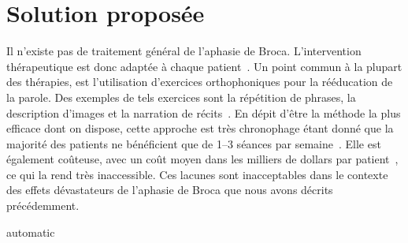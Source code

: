 \section{Solution proposée}

Il n'existe pas de traitement général de l'aphasie de Broca.
L'intervention thérapeutique est donc adaptée à chaque patient~\cite{Acharya_Wroten_2022}.
Un point commun à la plupart des thérapies, 
est l'utilisation d'exercices orthophoniques pour la rééducation de la parole.
Des exemples de tels exercices sont 
la répétition de phrases, la description d'images et la narration de récits~\cite{recover}.
En dépit d'être la méthode la plus efficace dont on dispose,
cette approche est très chronophage étant donné que 
la majorité des patients ne bénéficient que de 1--3 séances par semaine~\cite{recover}.
Elle est également coûteuse, 
avec un coût moyen dans les milliers de dollars par patient~\cite{Liu_Huang_Xu_Wu_Tao_Chen_2021,Jacobs_Ellis_2021},
ce qui la rend très inaccessible.
Ces lacunes sont inacceptables dans le contexte des 
effets dévastateurs de l'aphasie de Broca que nous avons décrits précédemment.

{automatic}